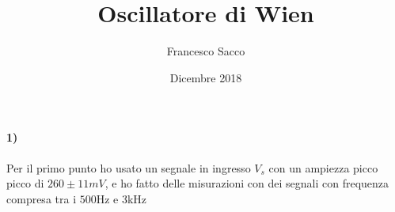 \documentclass{article}
\date{Dicembre 2018}
\author{Francesco Sacco}
\title{Oscillatore di Wien}
\begin{document}
\maketitle
\paragraph{1)}
	Per il primo punto ho usato un segnale in ingresso $V_s$ con un ampiezza picco picco di $260\pm11 mV$, e ho fatto delle misurazioni con dei segnali con frequenza compresa tra i $500$Hz e $3$kHz
\end{document}
